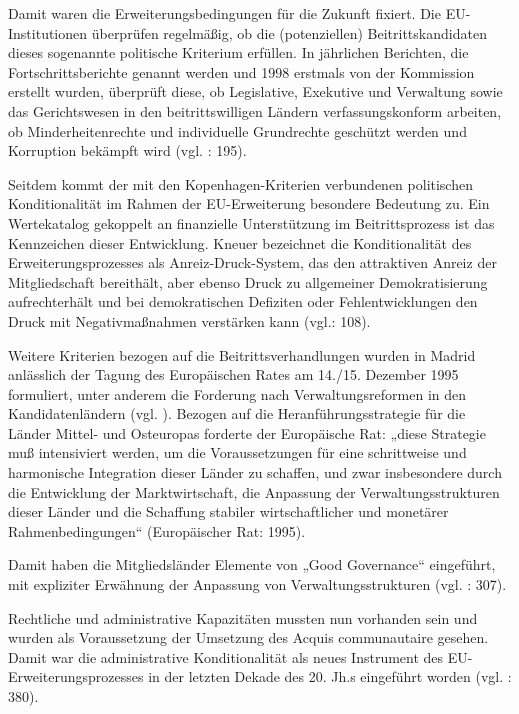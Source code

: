 Damit waren die Erweiterungsbedingungen für die Zukunft fixiert. Die EU-Institutionen überprüfen regelmäßig, ob die (potenziellen) Beitrittskandidaten dieses sogenannte politische Kriterium erfüllen. In jährlichen Berichten, die Fortschrittsberichte genannt werden und 1998 erstmals von der Kommission erstellt wurden, überprüft diese, ob Legislative, Exekutive und Verwaltung sowie das Gerichtswesen in den beitrittswilligen Ländern verfassungskonform arbeiten, ob Minderheitenrechte und individuelle Grundrechte geschützt werden und Korruption bekämpft wird (vgl. \cite{brusis09}: 195).
\par
Seitdem kommt der mit den Kopenhagen-Kriterien verbundenen politischen Konditionalität im Rahmen der EU-Erweiterung besondere Bedeutung zu. Ein Wertekatalog gekoppelt an finanzielle Unterstützung im Beitrittsprozess ist das Kennzeichen dieser Entwicklung. Kneuer bezeichnet die Konditionalität des Erweiterungsprozesses als Anreiz-Druck-System, das den attraktiven Anreiz der Mitgliedschaft bereithält, aber ebenso Druck zu allgemeiner Demokratisierung aufrechterhält und bei demokratischen Defiziten oder Fehlentwicklungen den Druck mit Negativmaßnahmen verstärken kann (vgl.\cite{kneuer07}: 108).\par
Weitere Kriterien bezogen auf die Beitrittsverhandlungen wurden in Madrid anlässlich der Tagung des Europäischen Rates am 14./15. Dezember 1995 formuliert, unter anderem die Forderung nach Verwaltungsreformen in den Kandidatenländern (vgl. \cite{dimit02}). Bezogen auf die Heranführungsstrategie für die Länder Mittel- und Osteuropas forderte der Europäische Rat:
„diese Strategie muß intensiviert werden, um die Voraussetzungen für eine schrittweise und harmonische Integration dieser Länder zu schaffen, und zwar insbesondere durch die Entwicklung der Marktwirtschaft, die Anpassung der Verwaltungsstrukturen dieser Länder und die Schaffung stabiler wirtschaftlicher und monetärer Rahmenbedingungen“ (Europäischer Rat: 1995).\par
Damit haben die Mitgliedsländer Elemente von „Good Governance“ eingeführt, mit expliziter Erwähnung der Anpassung von Verwaltungsstrukturen (vgl. \cite{sabzei}: 307).\par
Rechtliche und administrative Kapazitäten mussten nun vorhanden sein und wurden als Voraussetzung der Umsetzung des Acquis communautaire gesehen. Damit war die administrative Konditionalität als neues Instrument des EU-Erweiterungsprozesses in der letzten Dekade des 20. Jh.s eingeführt worden (vgl. \cite{tomtul}: 380).\par
